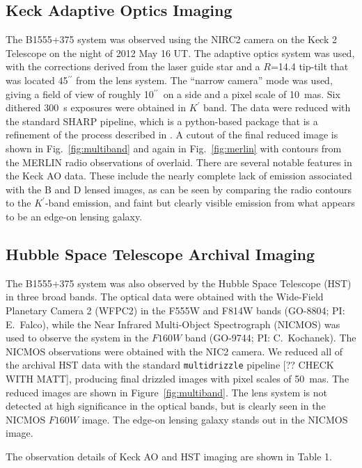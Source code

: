 \documentclass[useAMS,usenatbib]{mn2e}
\begin{document}
\subsection{Keck Adaptive Optics Imaging}

The B1555+375 system was observed using the NIRC2 camera on the Keck 2
Telescope on the night of 2012 May 16 UT.  The adaptive optics system
was used, with the corrections derived from the laser guide star and a
$R$=14.4 tip-tilt that was located 45$^{\prime\prime}$ from the lens
system.  The ``narrow camera'' mode was used, giving a field of view
of roughly 10$^{\prime\prime}$\ on a side and a pixel scale of 10~mas.
Six dithered 300~s exposures were obtained in $K^{\prime}$ band.  The
data were reduced with the standard SHARP pipeline, which is a
python-based package that is a refinement of the process described in
\citet{Auger_EELS1}.  A cutout of the final reduced image is shown in
Fig.~\ref{fig:multiband} and again in Fig.~\ref{fig:merlin} with
contours from the MERLIN radio observations of \citet{Marlow}
overlaid.  There are several notable features in the Keck AO data.
These include the nearly complete lack of emission associated with the
B and D lensed images, as can be seen by comparing the radio contours
to the $K^\prime$-band emission, and faint but clearly visible
emission from what appears to be an edge-on lensing galaxy.

\subsection{Hubble Space Telescope Archival Imaging}

The B1555+375 system was also observed by the Hubble Space Telescope
(HST) in three broad bands.  The optical data were obtained with the
Wide-Field Planetary Camera 2 (WFPC2) in the F555W and F814W bands
(GO-8804; PI: E.\ Falco), while the Near Infrared Multi-Object
Spectrograph (NICMOS) was used to observe the system in the $F160W$
band (GO-9744; PI: C.\ Kochanek).  The NICMOS observations were
obtained with the NIC2 camera.  We reduced all of the archival HST
data with the standard {\tt multidrizzle} pipeline [?? CHECK WITH
  MATT], producing final drizzled images with pixel scales of 50~mas.
The reduced images are shown in Figure~\ref{fig:multiband}.  The lens
system is not detected at high significance in the optical bands, but
is clearly seen in the NICMOS $F160W$ image.  The edge-on lensing
galaxy stands out in the NICMOS image.

The observation details of Keck AO and HST imaging are shown in Table 1.
\end{document}
